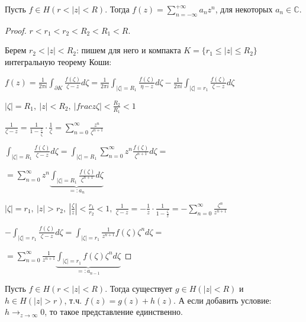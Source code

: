 \begin{theorem}
    Пусть $f \in H(r < |z| < R)$. Тогда $f(z) = \sum_{n = -\infty}^{+\infty} a_n z^n$, для некоторых $a_n \in \mathbb{C}$.
\end{theorem}
\begin{proof}
    $r < r_1 < r_2 < R_2 < R_1 < R$.

    Берем $r_2 < |z| < R_2$: пишем для него и компакта $K =\{ r_1 \leq |z| \leq R_2 \}$ интегральную теорему Коши:

    $f(z) = \frac{1}{2 \pi i} \int_{\partial K} {\frac{f(\zeta)}{\zeta - z} d\zeta} = \frac{1}{2 \pi i} \int_{|\zeta| = R_1} { \frac{f(\zeta)}{\eta - z} d\zeta } - \frac{1}{2 \pi i} \int_{|\zeta| = r_1} { \frac{f(\zeta)}{\zeta - z} d\zeta }$

    $|\zeta| = R_1, \ |z| < R_2, \ |frac{z}{\zeta}| < \frac{R_2}{R_1} < 1$

    $\frac{1}{\zeta - z} = \frac{1}{1 - \frac{z}{\zeta}} \cdot \frac{1}{\zeta} = \sum_{n=0}^{\infty} { \frac{z^n}{\zeta^{n+1}} }$

    $\int_{|\zeta| = R_1} { \frac{f(\zeta)}{\zeta - z} d\zeta } = \int_{|\zeta| = R_1} { \sum_{n=0}^{\infty} z^n \frac{f(\zeta)}{\zeta^{n+1}} d\zeta } = $

    $= \sum_{n = 0}^{\infty} {z^n \underbrace{\int_{|\zeta| = R_1} { \frac{f(\zeta)}{\zeta^{n + 1}} d\zeta }}_{=: a_n}}$


    $|\zeta| = r_1, \ |z| > r_2, \ |\frac{\zeta}{z}| < \frac{r_1}{r_2} < 1, \ \frac{1}{\zeta - z} = -\frac{1}{z} \cdot \frac{1}{1 - \frac{\zeta}{z}} = -\sum_{n = 0}^{\infty} \frac{\zeta^n}{z^{n + 1}}$

    $-\int_{|\zeta| = r_1} { \frac{f(\zeta)}{\zeta - z} d\zeta } = \int_{|\zeta| = r_1} { \frac{1}{z^{n + 1}} f(\zeta) \zeta^n d\zeta } = $

    $= \sum_{n=0}^{\infty} \frac{1}{z^{n+1}} \underbrace{\int_{|\zeta| = r_1}{f(\zeta) \zeta^n d\zeta}}_{=: a_{n-1}}$
\end{proof}

\begin{theorem}
    Пусть $f \in H(r < |z| < R)$. Тогда существует $g \in H(|z| < R)$ и $h \in H(|z| > r)$, т.ч. $f(z) = g(z) + h(z)$. А если добавить условие: $h \rightarrow_{z \rightarrow \infty} 0$, то такое представление единственно.
\end{theorem}

